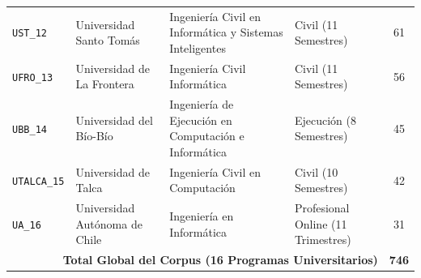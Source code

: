 \documentclass[11pt,a4paper]{article}
\begin{document}
\begin{small}
\begin{longtable}{p{2.2cm} >{\raggedright\arraybackslash}p{3.5cm} >{\raggedright\arraybackslash}p{4.2cm} >{\raggedright\arraybackslash}p{2.6cm} c}
\texttt{UST\_12} & Universidad Santo Tomás & Ingeniería Civil en Informática y Sistemas Inteligentes & Civil (11 Semestres) & 61 \\
\texttt{UFRO\_13} & Universidad de La Frontera & Ingeniería Civil Informática & Civil (11 Semestres) & 56 \\
\texttt{UBB\_14} & Universidad del Bío-Bío & Ingeniería de Ejecución en Computación e Informática & Ejecución (8 Semestres) & 45 \\
\texttt{UTALCA\_15} & Universidad de Talca & Ingeniería Civil en Computación & Civil (10 Semestres) & 42 \\
\texttt{UA\_16} & Universidad Autónoma de Chile & Ingeniería en Informática & Profesional Online (11 Trimestres) & 31 \\
\midrule
\multicolumn{4}{r}{\textbf{Total Global del Corpus (16 Programas Universitarios)}} & \textbf{746} \\
\end{longtable}
\end{small}
\end{document}
